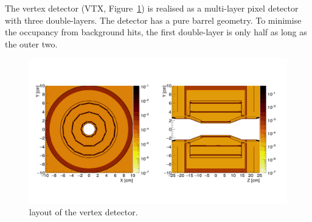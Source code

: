 The vertex detector (VTX, Figure~\ref{fig:det:vertex}) is realised as a multi-layer pixel detector with three double-layers. The detector has a pure barrel geometry. To minimise the occupancy from background hits,
the first double-layer is only half as long as the outer two. 



\begin{figure}[t!]
\centering
\includegraphics[width=0.8\hsize]{Detector/fig/vertex.png}
\caption{layout of the vertex detector.}
\label{fig:det:vertex}
\end{figure}


